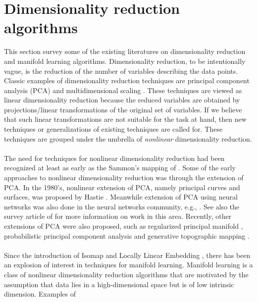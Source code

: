 \section{Dimensionality reduction algorithms}
\label{sec:dimens-reduct-algor}
This section survey some of the existing literatures on dimensionality
reduction and manifold learning algorithms. Dimensionality reduction,
to be intentionally vague, is the reduction of the number of variables
describing the data points. Classic examples of dimensionality
reduction techniques are principal component analysis (PCA)
\citep{pearson01:_on,hotelling33:_analy} and multidimensional scaling
\citep{torgesen52:_multid}. These techniques are viewed as linear
dimensionality reduction because the reduced variables are obtained by
projections/linear transformations of the original set of
variables. If we believe that such linear transformations are not
suitable for the task at hand, then new techniques or generalizations
of existing techniques are called for. These techniques are grouped
under the umbrella of \emph{nonlinear} dimensionality reduction. \\
\\
\noindent
The need for techniques for nonlinear dimensionality reduction had
been recognized at least as early as the Sammon's mapping of
\citet{j.69:_nonlin}. Some of the early approaches to nonlinear
dimensionality reduction was through the extension of PCA. In the
1980's, nonlinear extension of PCA, namely principal curves and
surfaces, was proposed by Hastie
\citet{hastie84:_princ,hastie89:_princ}. Meanwhile extension of PCA
using neural networks was also done in the neural networks community,
e.g., \citet{rubner89,oja92:_princ}.  See also the survey article of
\citet{oja02:_unsup} for more information on work in this
area. Recently, other extensions of PCA were also proposed, such as
regularized principal manifold \citet{smola01:_regul_princ_manif} ,
probabilistic principal component analysis \citet{tipping99:_mixtur}
and generative topographic mapping
\citet{bishop98:_gtm}. \\ \\
%
% 
\noindent Since the introduction of Isomap
\citep{tenebaum00:_global_geomet_framew_nonlin_dimen_reduc} and
Locally Linear Embedding \citep{roweis00:_nonlin}, there has been an
explosion of interest in techniques for manifold learning. Manifold
learning is a class of nonlinear dimensionality reduction algorithms
that are motivated by the assumption that data lies in a
high-dimensional space but is of low intrinsic dimension. Examples of
